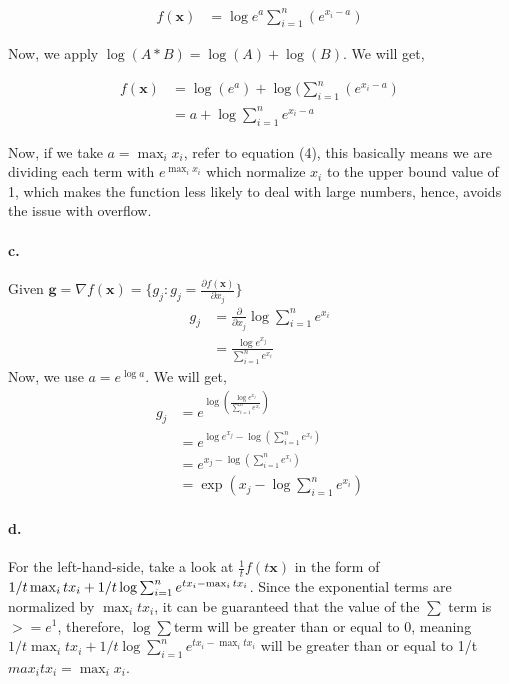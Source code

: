 \documentclass{scrartcl}
\begin{document}
\begin{align}
f(\boldsymbol{x}) 
&= \log {e^{a}}\sum_{i=1}^{n} (e^{x_i-a})
\end{align}

Now, we apply $\log(A*B) = \log(A) + \log(B)$. We will get,

\begin{align}
f(\boldsymbol{x}) 
&=\log(e^{a}) + \log(\sum_{i=1}^{n} (e^{x_i-a})\\
&= a + \log\sum_{i=1}^{n} e^{x_i-a}
\end{align}

Now, if we take $a = \max_ix_i$, refer to equation (4), this basically means we are dividing each term with $e^{\max_ix_i}$ which normalize $x_i$ to the upper bound value of 1, which makes the function less likely to deal with large numbers, hence, avoids the issue with overflow.

\paragraph{c.}
Given $\mathbf{g} = \nabla f(\mathbf{x}) = \{ g_j : g_j = \frac{\partial f(\mathbf{x})}{\partial x_j}\}$
\begin{align}
g_j
&= \frac{ \partial}{\partial x_j} \log \sum_{i=1}^{n} e^{x_i}\\
&= \frac{\log e^{x_j}}{ \sum_{i=1}^{n} e^{x_i}} 
\end{align}
Now, we use $a = e^{\log{a}}$. We will get,
\begin{align}
g_j
&= e^{ \log(\frac{\log e^{x_j}}{ \sum_{i=1}^{n} e^{x_i}} )}\\
&= e^{ \log e^{x_j} - \log({ \sum_{i=1}^{n} e^{x_i}} )}\\
&= e^{ x_j - \log({ \sum_{i=1}^{n} e^{x_i}} )}\\
&= \exp(x_j - \log{ \sum_{i=1}^{n} e^{x_i}} )
\end{align}

\paragraph{d.}

For the left-hand-side, take a look at $\frac{1}{t}f(t\mathbf{x})$ in the form of $ 1/t\max_itx_i +\\ 1/t\log\sum_{i=1}^{n} e^{tx_i-\max_itx_i}$. Since the exponential terms are normalized by $\max_itx_i$, it can be guaranteed that the value of the $\sum$ term is $>= e^{1}$, therefore, $\log \sum$term will be greater than or equal to 0, meaning  $ 1/t\max_itx_i + 1/t\log\sum_{i=1}^{n} e^{tx_i-\max_itx_i}$ will be greater than or equal to 1/t$max_itx_i= \max_ix_i$. 
\end{document}

